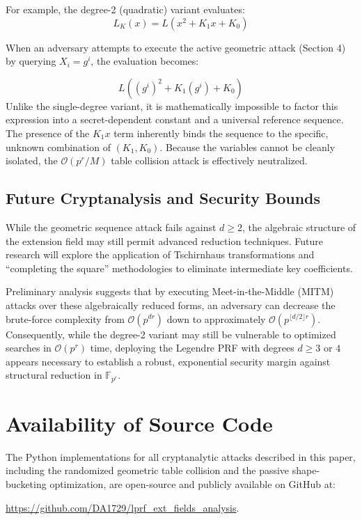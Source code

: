 \documentclass[runningheads]{llncs}
\begin{document}
For example, the degree-2 (quadratic) variant evaluates:
\begin{equation*}
L_K(x) = L(x^2 + K_1x + K_0)
\end{equation*}

When an adversary attempts to execute the active geometric attack (Section 4) by querying $X_i = g^i$, the evaluation becomes:

\begin{equation*}
L( (g^i)^2 + K_1(g^i) + K_0 )
\end{equation*}
Unlike the single-degree variant, it is mathematically impossible to factor this expression into a secret-dependent constant and a universal reference sequence. The presence of the $K_1x$ term inherently binds the sequence to the specific, unknown combination of $(K_1, K_0)$. Because the variables cannot be cleanly isolated, the $\mathcal{O}(p^r/M)$ table collision attack is effectively neutralized.

\subsection{Future Cryptanalysis and Security Bounds}

While the geometric sequence attack fails against $d \geq 2$, the algebraic structure of the extension field may still permit advanced reduction techniques. Future research will explore the application of Tschirnhaus transformations and ``completing the square'' methodologies to eliminate intermediate key coefficients.

Preliminary analysis suggests that by executing Meet-in-the-Middle (MITM) attacks over these algebraically reduced forms, an adversary can decrease the brute-force complexity from $\mathcal{O}(p^{dr})$ down to approximately $\mathcal{O}(p^{\lfloor d/2 \rfloor r})$. Consequently, while the degree-2 variant may still be vulnerable to optimized searches in $\mathcal{O}(p^r)$ time, deploying the Legendre PRF with degrees $d \geq 3$ or $4$ appears necessary to establish a robust, exponential security margin against structural reduction in $\mathbb{F}_{p^r}$.

\section*{Availability of Source Code}
The Python implementations for all cryptanalytic attacks described in this paper, including the randomized geometric table collision and the passive shape-bucketing optimization, are open-source and publicly available on GitHub at: 
\begin{center}
    \url{https://github.com/DA1729/lprf\_ext\_fields\_analysis}.
\end{center}
\end{document}
